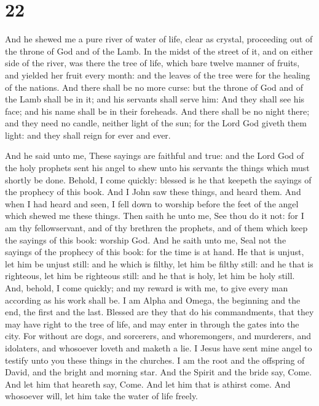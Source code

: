 \hypertarget{section-21}{%
\section{22}\label{section-21}}

 And he shewed me a pure river of water of life, clear as
crystal, proceeding out of the throne of God and of the Lamb.
 In the midst of the street of it, and on either side of the
river, was there the tree of life, which bare twelve manner of fruits,
and yielded her fruit every month: and the leaves of the tree were for
the healing of the nations.  And there shall be no more
curse: but the throne of God and of the Lamb shall be in it; and his
servants shall serve him:  And they shall see his face; and
his name shall be in their foreheads.  And there shall be no
night there; and they need no candle, neither light of the sun; for the
Lord God giveth them light: and they shall reign for ever and ever.

 And he said unto me, These sayings are faithful and true:
and the Lord God of the holy prophets sent his angel to shew unto his
servants the things which must shortly be done.  Behold, I
come quickly: blessed is he that keepeth the sayings of the prophecy of
this book.  And I John saw these things, and heard them. And
when I had heard and seen, I fell down to worship before the feet of the
angel which shewed me these things.  Then saith he unto me,
See thou do it not: for I am thy fellowservant, and of thy brethren the
prophets, and of them which keep the sayings of this book: worship God.
 And he saith unto me, Seal not the sayings of the prophecy
of this book: for the time is at hand.  He that is unjust,
let him be unjust still: and he which is filthy, let him be filthy
still: and he that is righteous, let him be righteous still: and he that
is holy, let him be holy still.  And, behold, I come
quickly; and my reward is with me, to give every man according as his
work shall be.  I am Alpha and Omega, the beginning and the
end, the first and the last.  Blessed are they that do his
commandments, that they may have right to the tree of life, and may
enter in through the gates into the city.  For without are
dogs, and sorcerers, and whoremongers, and murderers, and idolaters, and
whosoever loveth and maketh a lie.  I Jesus have sent mine
angel to testify unto you these things in the churches. I am the root
and the offspring of David, and the bright and morning star.
 And the Spirit and the bride say, Come. And let him that
heareth say, Come. And let him that is athirst come. And whosoever will,
let him take the water of life freely.


